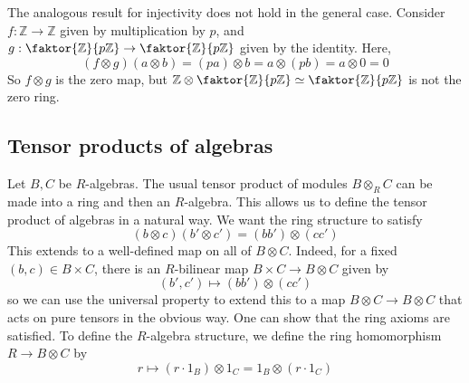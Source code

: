 The analogous result for injectivity does not hold in the general case.
Consider \( f : \mathbb Z \to \mathbb Z \) given by multiplication by \( p \), and \( g : \faktor{\mathbb Z}{p\mathbb Z} \to \faktor{\mathbb Z}{p\mathbb Z} \) given by the identity.
Here,
\[ (f \otimes g)(a \otimes b) = (pa) \otimes b = a \otimes (pb) = a \otimes 0 = 0 \]
So \( f \otimes g \) is the zero map, but \( \mathbb Z \otimes \faktor{\mathbb Z}{p\mathbb Z} \simeq \faktor{\mathbb Z}{p\mathbb Z} \) is not the zero ring.

\subsection{Tensor products of algebras}
Let \( B, C \) be \( R \)-algebras.
The usual tensor product of modules \( B \otimes_R C \) can be made into a ring and then an \( R \)-algebra.
This allows us to define the tensor product of algebras in a natural way.
We want the ring structure to satisfy
\[ (b \otimes c)(b' \otimes c') = (bb') \otimes (cc') \]
This extends to a well-defined map on all of \( B \otimes C \).
Indeed, for a fixed \( (b, c) \in B \times C \), there is an \( R \)-bilinear map \( B \times C \to B \otimes C \) given by
\[ (b', c') \mapsto (bb') \otimes (cc') \]
so we can use the universal property to extend this to a map \( B \otimes C \to B \otimes C \) that acts on pure tensors in the obvious way.
One can show that the ring axioms are satisfied.
To define the \( R \)-algebra structure, we define the ring homomorphism \( R \to B \otimes C \) by
\[ r \mapsto (r \cdot 1_B) \otimes 1_C = 1_B \otimes (r \cdot 1_C) \]
